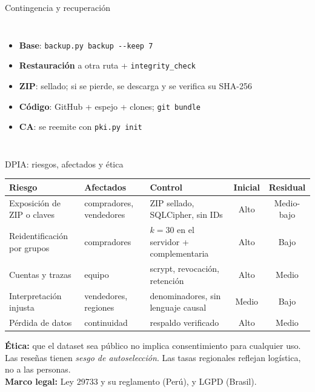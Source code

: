\documentclass[aspectratio=169,11pt]{beamer}
\begin{document}
\begin{frame}{Contingencia y recuperación}
\small
\begin{columns}[T,onlytextwidth]
\begin{itemize}\setlength\itemsep{3pt}
\item \textbf{Base}: \texttt{backup.py backup -{}-keep 7}
\item \textbf{Restauración} a otra ruta + \texttt{integrity\_check}
\item \textbf{ZIP}: sellado; si se pierde, se descarga y se verifica su SHA-256
\item \textbf{Código}: GitHub + espejo + clones; \texttt{git bundle}
\item \textbf{CA}: se reemite con \texttt{pki.py init}
\end{itemize}
\centering
{}
\end{columns}
\end{frame}

\begin{frame}{DPIA: riesgos, afectados y ética}
\scriptsize
\begin{tabularx}{\textwidth}{@{}p{3.1cm} p{2.3cm} Y c c@{}}
\toprule
Riesgo & Afectados & Control & Inicial & Residual\\
\midrule
Exposición de ZIP o claves & compradores, vendedores & ZIP sellado, SQLCipher, sin IDs & Alto & Medio-bajo\\
Reidentificación por grupos & compradores & $k{=}30$ en el servidor + complementaria & Alto & Bajo\\
Cuentas y trazas & equipo & scrypt, revocación, retención & Alto & Medio\\
Interpretación injusta & vendedores, regiones & denominadores, sin lenguaje causal & Medio & Bajo\\
Pérdida de datos & continuidad & respaldo verificado & Alto & Medio\\
\bottomrule
\end{tabularx}
\medskip

\small\textbf{Ética:} que el dataset sea público no implica consentimiento para cualquier uso. Las reseñas tienen \emph{sesgo de autoselección}. Las tasas regionales reflejan logística, no a las personas.\\
\textbf{Marco legal:} Ley 29733 y su reglamento (Perú), y LGPD (Brasil).
\end{frame}
\end{document}
